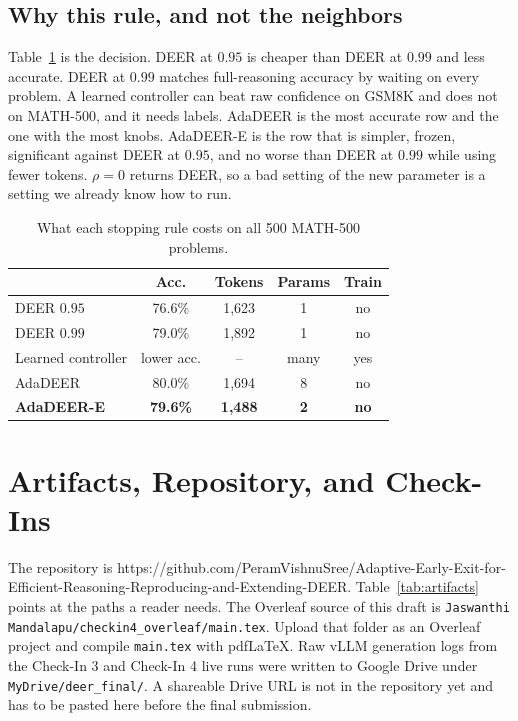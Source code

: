 \documentclass[conference]{IEEEtran}
\begin{document}
\subsection{Why this rule, and not the neighbors}
Table~\ref{tab:decision} is the decision.
DEER at $0.95$ is cheaper than DEER at $0.99$ and less accurate.
DEER at $0.99$ matches full-reasoning accuracy by waiting on every problem.
A learned controller can beat raw confidence on GSM8K and does not on MATH-500, and it needs labels.
AdaDEER is the most accurate row and the one with the most knobs.
AdaDEER-E is the row that is simpler, frozen, significant against DEER at $0.95$, and no worse than DEER at $0.99$ while using fewer tokens.
$\rho=0$ returns DEER, so a bad setting of the new parameter is a setting we already know how to run.

\begin{table}[t]
\caption{What each stopping rule costs on all 500 MATH-500 problems.}
\label{tab:decision}
\centering
\footnotesize
\begin{tabular}{@{}lcccc@{}}
\toprule
 & Acc. & Tokens & Params & Train \\
\midrule
DEER $0.95$ & 76.6\% & 1{,}623 & 1 & no \\
DEER $0.99$ & 79.0\% & 1{,}892 & 1 & no \\
Learned controller & lower acc. & -- & many & yes \\
AdaDEER & 80.0\% & 1{,}694 & 8 & no \\
\textbf{AdaDEER-E} & \textbf{79.6\%} & \textbf{1{,}488} & \textbf{2} & \textbf{no} \\
\bottomrule
\end{tabular}
\end{table}

\clearpage
\section{Artifacts, Repository, and Check-Ins}
The repository is
{\scriptsize https://github.com/\allowbreak PeramVishnuSree/\allowbreak Adaptive-Early-Exit-for-\allowbreak Efficient-Reasoning-\allowbreak Reproducing-and-Extending-DEER}.
Table~\ref{tab:artifacts} points at the paths a reader needs.
The Overleaf source of this draft is \texttt{Jaswanthi Mandalapu/checkin4\_overleaf/main.tex}.
Upload that folder as an Overleaf project and compile \texttt{main.tex} with pdf\LaTeX.
Raw vLLM generation logs from the Check-In 3 and Check-In 4 live runs were written to Google Drive under \texttt{MyDrive/deer\_final/}.
A shareable Drive URL is not in the repository yet and has to be pasted here before the final submission.
\end{document}

